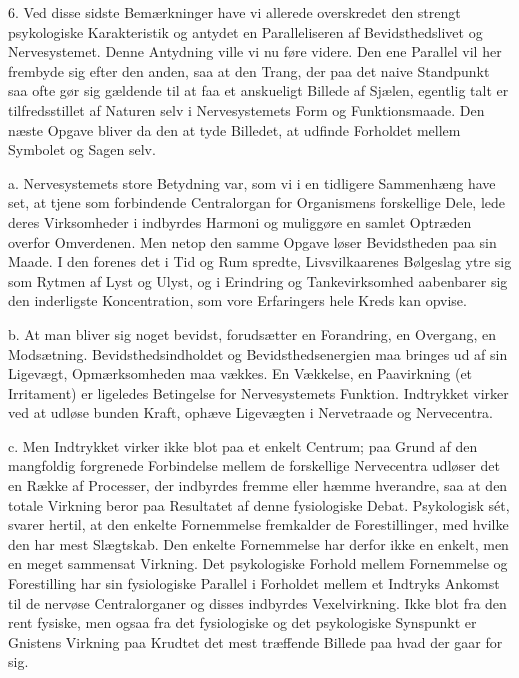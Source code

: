 \documentclass[12pt,a4paper,openany]{book}
\newcommand{\opage}[1]{\marginnote{\footnotesize\textit{[#1]}}}
\begin{document}
\opage{61}6. Ved disse sidste Bemærkninger have vi allerede overskredet
den strengt psykologiske Karakteristik og antydet en Paralleliseren af
Bevidsthedslivet og Nervesystemet. Denne Antydning ville vi nu føre
videre. Den ene Parallel vil her frembyde sig efter den anden, saa at
den Trang, der paa det naive Standpunkt saa ofte gør sig gældende til at
faa et anskueligt Billede af Sjælen, egentlig talt er tilfredsstillet af
Naturen selv i Nervesystemets Form og Funktionsmaade. Den næste Opgave
bliver da den at tyde Billedet, at udfinde Forholdet mellem Symbolet og
Sagen selv.

a. Nervesystemets store Betydning var, som vi i en tidligere Sammenhæng
have set, at tjene som forbindende Centralorgan for Organismens
forskellige Dele, lede deres Virksomheder i indbyrdes Harmoni og
muliggøre en samlet Optræden overfor Omverdenen. Men netop den samme
Opgave løser Bevidstheden paa sin Maade. I den forenes det i Tid og Rum
spredte, Livsvilkaarenes Bølgeslag ytre sig som Rytmen af Lyst og Ulyst,
og i Erindring og Tankevirksomhed aabenbarer sig den inderligste
Koncentration, som vore Erfaringers hele Kreds kan opvise.

b. At man bliver sig noget bevidst, forudsætter en Forandring, en
Overgang, en Modsætning. Bevidsthedsindholdet og Bevidsthedsenergien maa
bringes ud af sin Ligevægt, Opmærksomheden maa vækkes. En Vækkelse, en
Paavirkning (et Irritament) er ligeledes Betingelse for Nervesystemets
Funktion. Indtrykket virker ved at udløse bunden Kraft, ophæve
Ligevægten i Nervetraade og Nervecentra.

c. Men Indtrykket virker ikke blot paa et enkelt Centrum; paa Grund af
den mangfoldig forgrenede Forbindelse mellem de forskellige Nervecentra
udløser det en Række af Processer, der indbyrdes fremme eller hæmme
hverandre, saa at den totale Virkning beror paa Resultatet af denne
fysiologiske Debat. Psykologisk sét, svarer hertil, at den enkelte
Fornemmelse fremkalder de Forestillinger, med hvilke den har mest
Slægtskab. Den enkelte Fornemmelse har derfor ikke en enkelt, men en
meget sammensat Virkning. Det psykologiske Forhold mellem Fornemmelse og
Forestilling har sin fysiologiske Parallel i Forholdet mellem et
Indtryks Ankomst til de nervøse Centralorganer og disses indbyrdes
Vexelvirkning. Ikke blot fra den
\opage{62}rent fysiske, men ogsaa fra det fysiologiske og det
psykologiske Synspunkt er Gnistens Virkning paa Krudtet det mest
træffende Billede paa hvad der gaar for sig.
\end{document}
